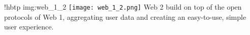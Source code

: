 \namedfigure
{!hbtp}
{img:web_1_2}
{\texttt{[image: web\_1\_2.png]}}
{Web 2 build on top of the open protocols of Web 1, aggregating user data and creating an easy-to-use, simple user experience.}
